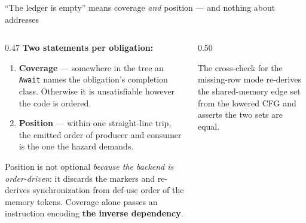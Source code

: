 \documentclass[aspectratio=169,9pt]{beamer}
\newcommand{\tsub}[1]{{\footnotesize\color{gray}#1}}
\newcommand{\key}[1]{\textcolor{acc}{\textbf{#1}}}
\newcommand{\bad}[1]{\textcolor{warn}{\textbf{#1}}}
\newcommand{\good}[1]{\textcolor{ok}{\textbf{#1}}}
\begin{document}
\begin{frame}{``The ledger is empty'' means coverage \emph{and} position --- and nothing about addresses}

\begin{columns}[T]
\begin{column}{0.47\textwidth}
\vspace{2pt}
\good{Two statements per obligation:}
\begin{enumerate}\itemsep3pt
  \item \key{Coverage} --- somewhere in the tree an \texttt{Await} names the obligation's completion class. Otherwise it is unsatisfiable however the code is ordered.
  \item \key{Position} --- within one straight-line trip, the emitted order of producer and consumer is the one the hazard demands.
\end{enumerate}

\vspace{5pt}
Position is not optional \emph{because the backend is order-driven}: it discards the markers and re-derives synchronization from def-use order of the memory tokens. Coverage alone passes an instruction encoding \bad{the inverse dependency}.
\end{column}
\begin{column}{0.50\textwidth}
\vspace{-2pt}

\vspace{3pt}
\tsub{The cross-check for the missing-row mode re-derives the shared-memory edge set from the lowered CFG and asserts the two sets are equal.}
\end{column}
\end{columns}
\end{frame}
\end{document}
